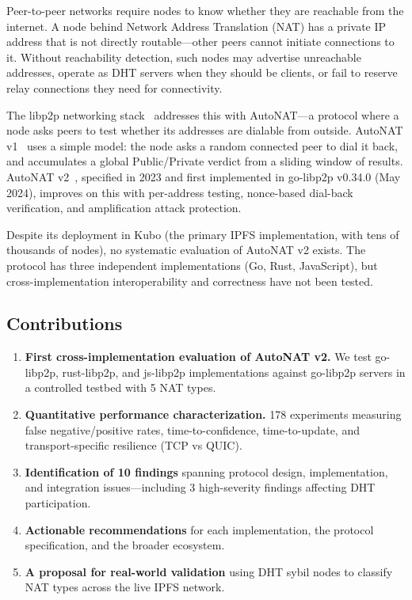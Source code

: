 \documentclass[conference]{IEEEtran}
\begin{document}
Peer-to-peer networks require nodes to know whether they are reachable from the internet. A node behind Network Address Translation (NAT) has a private IP address that is not directly routable---other peers cannot initiate connections to it. Without reachability detection, such nodes may advertise unreachable addresses, operate as DHT servers when they should be clients, or fail to reserve relay connections they need for connectivity.

The libp2p networking stack~\cite{libp2p-specs} addresses this with AutoNAT---a protocol where a node asks peers to test whether its addresses are dialable from outside. AutoNAT v1~\cite{autonat-v1} uses a simple model: the node asks a random connected peer to dial it back, and accumulates a global Public/Private verdict from a sliding window of results. AutoNAT v2~\cite{autonat-v2-spec}, specified in 2023 and first implemented in go-libp2p v0.34.0 (May 2024), improves on this with per-address testing, nonce-based dial-back verification, and amplification attack protection.

Despite its deployment in Kubo (the primary IPFS implementation, with tens of thousands of nodes), no systematic evaluation of AutoNAT v2 exists. The protocol has three independent implementations (Go, Rust, JavaScript), but cross-implementation interoperability and correctness have not been tested.

\subsection{Contributions}

\begin{enumerate}
\item \textbf{First cross-implementation evaluation of AutoNAT v2.} We test go-libp2p, rust-libp2p, and js-libp2p implementations against go-libp2p servers in a controlled testbed with 5 NAT types.
\item \textbf{Quantitative performance characterization.} 178 experiments measuring false negative/positive rates, time-to-confidence, time-to-update, and transport-specific resilience (TCP vs QUIC).
\item \textbf{Identification of 10 findings} spanning protocol design, implementation, and integration issues---including 3 high-severity findings affecting DHT participation.
\item \textbf{Actionable recommendations} for each implementation, the protocol specification, and the broader ecosystem.
\item \textbf{A proposal for real-world validation} using DHT sybil nodes to classify NAT types across the live IPFS network.
\end{enumerate}
\end{document}
